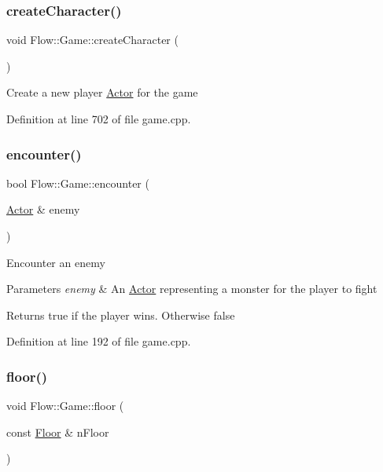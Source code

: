 \subsubsection{\texorpdfstring{create\+Character()}{createCharacter()}}
{\footnotesize\ttfamily void Flow\+::\+Game\+::create\+Character (\begin{DoxyParamCaption}{ }\end{DoxyParamCaption})}

Create a new player \hyperlink{class_flow_1_1_actor}{Actor} for the game 

Definition at line 702 of file game.\+cpp.

\hypertarget{class_flow_1_1_game_a6dae12a63733a289b34a03dd8d709139}{}\label{class_flow_1_1_game_a6dae12a63733a289b34a03dd8d709139} 
\subsubsection{\texorpdfstring{encounter()}{encounter()}}
{\footnotesize\ttfamily bool Flow\+::\+Game\+::encounter (\begin{DoxyParamCaption}\item[{\hyperlink{class_flow_1_1_actor}{Actor} \&}]{enemy }\end{DoxyParamCaption})}

Encounter an enemy 
\begin{DoxyParams}{Parameters}
{\em enemy} & An \hyperlink{class_flow_1_1_actor}{Actor} representing a monster for the player to fight \\
\hline
\end{DoxyParams}
\begin{DoxyReturn}{Returns}
true if the player wins. Otherwise false 
\end{DoxyReturn}


Definition at line 192 of file game.\+cpp.

\hypertarget{class_flow_1_1_game_a00ae48e872335db0232eeb370159a3d7}{}\label{class_flow_1_1_game_a00ae48e872335db0232eeb370159a3d7} 
\subsubsection{\texorpdfstring{floor()}{floor()}\hspace{0.1cm}{\footnotesize\ttfamily [1/2]}}
{\footnotesize\ttfamily void Flow\+::\+Game\+::floor (\begin{DoxyParamCaption}\item[{const \hyperlink{class_flow_1_1_floor}{Floor} \&}]{n\+Floor }\end{DoxyParamCaption})}

